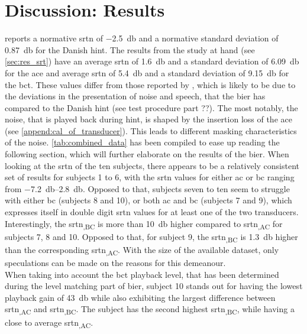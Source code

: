 \section{Discussion: Results}\label{sec:disc_res}
\citep{hint_2011} reports a normative \gls{srtn} of \SI{-2.5}{\decibel} and a normative standard deviation of \SI{0.87}{\decibel} for the Danish \gls{hint}. The results from the study at hand (see \autoref{sec:res_srt}) have an average \gls{srtn} of \SI{1.6}{\decibel} and a standard deviation of \SI{6.09}{\decibel} for the \gls{ace} and average \gls{srtn} of \SI{5.4}{\decibel} and a standard deviation of \SI{9.15}{\decibel} for the \gls{bct}.
These values differ from those reported by \citep{hint_2011}, which is likely to be due to the deviations in the presentation of noise and speech, that the \gls{bier} has compared to the Danish \gls{hint} (see test procedure part ??).
The most notably, the noise, that is played back during \gls{hint}, is shaped by the insertion loss of the \gls{ace} (see \autoref{append:cal_of_transducer}). This leads to different masking characteristics of the noise. 
\autoref{tab:combined_data} has been compiled to ease up reading the following section, which will further elaborate on the results of the \gls{bier}.
When looking at the \gls{srtn} of the ten subjects, there appears to be a relatively consistent set of results for subjects 1 to 6, with the \gls{srtn} values for either \gls{ac} or \gls{bc} ranging from \SIrange{-7.2}{2.8}{\decibel}. 
Opposed to that, subjects seven to ten seem to struggle with either \gls{bc} (subjects 8 and 10), or both \gls{ac} and \gls{bc} (subjects 7 and 9), which expresses itself in double digit \gls{srtn} values for at least one of the two transducers. 
Interestingly, the \gls{srtn}\textsubscript{,BC} is more than \SI{10}{\decibel} higher compared to \gls{srtn}\textsubscript{,AC} for subjects 7, 8 and 10. Opposed to that, for subject 9, the \gls{srtn}\textsubscript{,BC} is \SI{1.3}{\decibel} higher than the corresponding \gls{srtn}\textsubscript{,AC}.
With the size of the available dataset, only speculations can be made on the reasons for this demeanour.\\
When taking into account the \gls{bct} playback level, that has been determined during the level matching part of \gls{bier}, subject 10 stands out for having the lowest playback gain of \SI{43}{\decibel} while also exhibiting the largest difference between \gls{srtn}\textsubscript{,AC} and \gls{srtn}\textsubscript{,BC}. 
The subject has the second highest \gls{srtn}\textsubscript{,BC}, while having a close to average \gls{srtn}\textsubscript{,AC}.
